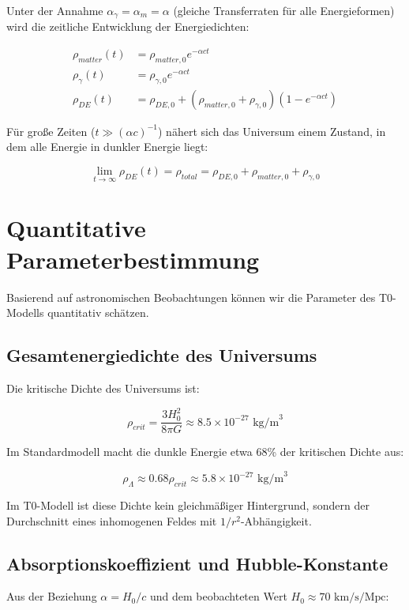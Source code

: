\documentclass[a4paper,12pt]{article}
\theoremstyle{definition}
\theoremstyle{remark}
\begin{document}
	Unter der Annahme $\alpha_{\gamma} = \alpha_{m} = \alpha$ (gleiche Transferraten für alle Energieformen) wird die zeitliche Entwicklung der Energiedichten:
	
	\begin{align}
		\rho_{matter}(t) &= \rho_{matter,0} e^{-\alpha c t} \\
		\rho_{\gamma}(t) &= \rho_{\gamma,0} e^{-\alpha c t} \\
		\rho_{DE}(t) &= \rho_{DE,0} + (\rho_{matter,0} + \rho_{\gamma,0})(1 - e^{-\alpha c t})
	\end{align}
	
	Für große Zeiten ($t \gg (\alpha c)^{-1}$) nähert sich das Universum einem Zustand, in dem alle Energie in dunkler Energie liegt:
	
	\begin{equation}
		\lim_{t \rightarrow \infty} \rho_{DE}(t) = \rho_{total} = \rho_{DE,0} + \rho_{matter,0} + \rho_{\gamma,0}
	\end{equation}
	
	\section{Quantitative Parameterbestimmung}
	Basierend auf astronomischen Beobachtungen können wir die Parameter des T0-Modells quantitativ schätzen.
	
	\subsection{Gesamtenergiedichte des Universums}
	Die kritische Dichte des Universums ist:
	
	\begin{equation}
		\rho_{crit} = \frac{3H_0^2}{8\pi G} \approx 8.5 \times 10^{-27} \text{ kg/m}^3
	\end{equation}
	
	Im Standardmodell macht die dunkle Energie etwa 68\% der kritischen Dichte aus:
	
	\begin{equation}
		\rho_{\Lambda} \approx 0.68 \rho_{crit} \approx 5.8 \times 10^{-27} \text{ kg/m}^3
	\end{equation}
	
	Im T0-Modell ist diese Dichte kein gleichmäßiger Hintergrund, sondern der Durchschnitt eines inhomogenen Feldes mit $1/r^2$-Abhängigkeit.
	
	\subsection{Absorptionskoeffizient und Hubble-Konstante}
	Aus der Beziehung $\alpha = H_0/c$ und dem beobachteten Wert $H_0 \approx 70 \text{ km/s/Mpc}$:
	
\end{document}
